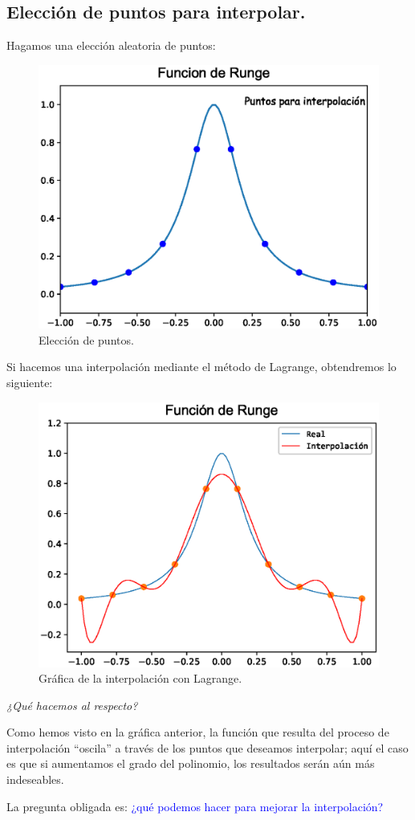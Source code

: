 \subsection*{Elección de puntos para interpolar.}
Hagamos una elección aleatoria de puntos:
\begin{figure}[H]
	\centering
	\includegraphics[scale=0.8]{Imagenes/Funcion_Runge_2017_01.eps}
	\caption{Elección de puntos.}
\end{figure}
Si hacemos una interpolación mediante el método de Lagrange, obtendremos lo siguiente:
\begin{figure}[H]
	\centering
	\includegraphics[scale=0.8]{Imagenes/Funcion_Runge_2017_02.eps}
	\caption{Gráfica de la interpolación con Lagrange.}
\end{figure}
\emph{¿Qué hacemos al respecto?}
\par
Como hemos visto en la gráfica anterior, la función que resulta del proceso de interpolación \enquote{oscila} a través de los puntos que deseamos interpolar; aquí el caso es que si aumentamos el grado del polinomio, los resultados serán aún más indeseables.
\par
La pregunta obligada es: \textcolor{blue}{¿qué podemos hacer para mejorar la interpolación?}
